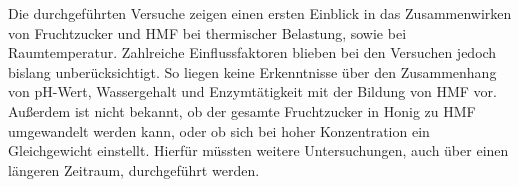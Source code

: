 Die durchgeführten Versuche zeigen einen ersten Einblick in das Zusammenwirken von Fruchtzucker und HMF bei thermischer Belastung, sowie bei Raumtemperatur. Zahlreiche Einflussfaktoren blieben bei den Versuchen jedoch bislang unberücksichtigt. So liegen keine Erkenntnisse über den Zusammenhang von pH-Wert, Wassergehalt und Enzymtätigkeit mit der Bildung von HMF vor. Außerdem ist nicht bekannt, ob der gesamte Fruchtzucker in Honig zu HMF umgewandelt werden kann, oder ob sich bei hoher Konzentration ein Gleichgewicht einstellt. Hierfür müssten weitere Untersuchungen, auch über einen längeren Zeitraum, durchgeführt werden.
